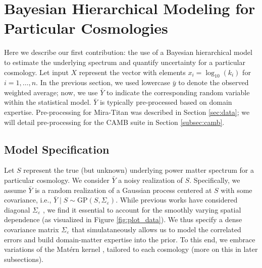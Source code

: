 \documentclass[11pt]{article}
\begin{document}

\section{Bayesian Hierarchical Modeling for Particular Cosmologies}
\label{sec:hm_fit}

Here we describe our first contribution: the use of a Bayesian hierarchical model 
to estimate the underlying spectrum and quantify uncertainty for a particular cosmology.
Let input $X$ represent the vector with elements $x_i = \log_{10}(k_i)$ for $i=1,\dots,n$.
In the previous section, we used lowercase $\bar{y}$ to denote 
the observed weighted average; now, we use $\bar{Y}$ to indicate the corresponding 
random variable within the statistical model.  
$\bar{Y}$ is typically pre-processed
based on domain expertise.  Pre-processing for Mira-Titan was described in Section 
\ref{sec:data}; we will detail pre-processing 
for the CAMB suite in Section \ref{subsec:camb}.

\subsection{Model Specification}

Let $S$ represent the true (but unknown) underlying power matter spectrum for
a particular cosmology.  We consider $\bar{Y}$ a noisy realization of $S$.
Specifically, we assume $\bar{Y}$ is a random realization of a Gaussian 
process centered at $S$ with some covariance, i.e., 
$\bar{Y}\mid S \sim \mathrm{GP}(S, \Sigma_\varepsilon)$.  While previous works
have considered diagonal $\Sigma_\varepsilon$ \citep{moran2024dpc}, we find it
essential to account for the smoothly varying spatial dependence
(as visualized in Figure \ref{fig:plot_data}).  We thus specify a dense 
covariance matrix $\Sigma_\varepsilon$ that simulataneously
allows us to model the correlated errors and build domain-matter expertise
into the prior. To this end, we embrace variations of the Mat\'ern kernel 
\citep{stein1999interpolation}, tailored to each cosmology (more on this in later 
subsections). 
\end{document}
